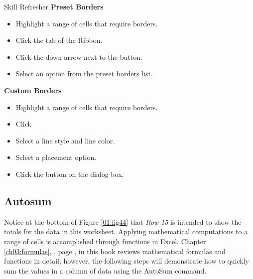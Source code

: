 \begin{center}
	\begin{sklbox}{Skill Refresher}
		\textbf{Preset Borders}
		\\
		\begin{itemize}
			\setlength{\itemsep}{0pt}
			\setlength{\parskip}{0pt}
			\setlength{\parsep}{0pt}
			
			\item Highlight a range of cells that require borders.
			\item Click the  tab of the Ribbon.
			\item Click the down arrow next to the  button.
			\item Select an option from the preset borders list.
			
		\end{itemize}

		\hfill \break
		\textbf{Custom Borders}
		\\
		\begin{itemize}
			\setlength{\itemsep}{0pt}
			\setlength{\parskip}{0pt}
			\setlength{\parsep}{0pt}
			
			\item Highlight a range of cells that require borders.
			\item Click 
			\item Select a line style and line color.
			\item Select a placement option.
			\item Click the  button on the dialog box.
			
		\end{itemize}

	\end{sklbox}
\end{center}

\subsection{Autosum}

Notice at the bottom of Figure \ref{01:fig44} that \textit{Row 15} is intended to show the totals for the data in this worksheet. Applying mathematical computations to a range of cells is accomplished through functions in Excel. Chapter \ref{ch03:formulas}, , page \pageref{ch03:formulas}, in this book reviews mathematical formulas and functions in detail; however, the following steps will demonstrate how to quickly sum the values in a column of data using the AutoSum command.

